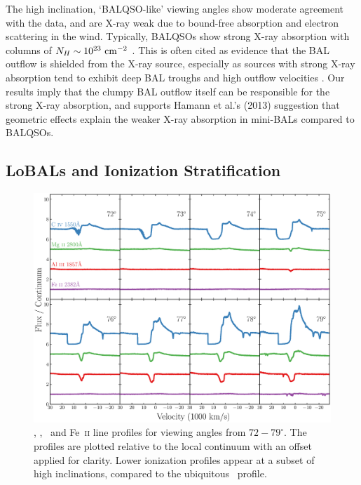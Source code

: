 \documentclass[useAMS,usenatbib]{mn2e_x}
\begin{document}
The high inclination, `BALQSO-like' viewing angles show moderate agreement with the data,
and are X-ray weak due to bound-free absorption and electron scattering in the wind.
Typically, BALQSOs show strong X-ray absorption with columns 
of $N_H\sim10^{23}~\rm{cm^{-2}}$ 
\citep{green1996,mathur2000,green2001,grupemathur2003}.
This is often cited as evidence that the BAL outflow is shielded from
the X-ray source, especially as sources with strong X-ray absorption tend
to exhibit deep BAL troughs and high outflow velocities 
\citep{brandt2000,laorbrandt2002,gallagher2006}.
Our results imply that the clumpy BAL outflow
itself can be responsible for the strong X-ray absorption, 
and supports Hamann et al.'s (2013) suggestion that 
geometric effects explain the weaker X-ray absorption in mini-BALs 
compared to BALQSOs.

\subsection{LoBALs and Ionization Stratification}


\begin{figure}
\centering
\includegraphics[width=1.0\textwidth]{figures/fig7.eps}
\caption
{
\civ , \mg , \al\ and Fe~\textsc{ii} line profiles for viewing angles
from $72-79^\circ$. The profiles are plotted relative to the local
continuum with an offset applied for clarity. Lower ionization
profiles appear at a subset of high inclinations, compared
to the ubiquitous \civ\ profile.
}
\label{fig:lobal}
\end{figure}
\end{document}
